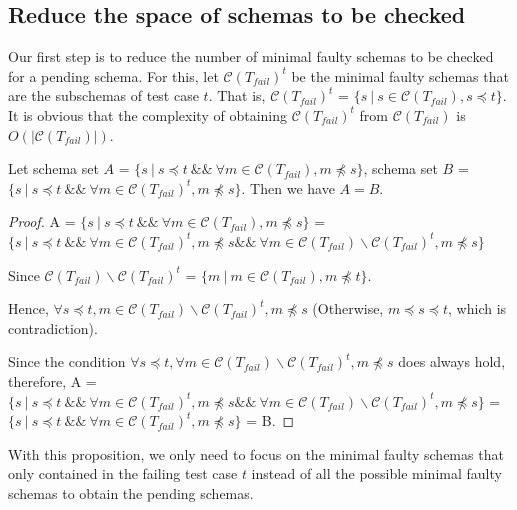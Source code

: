 \subsection{Reduce the space of schemas to be checked}
Our first step is to reduce the number of minimal faulty schemas to be checked for a pending schema.  For this, let $\mathcal{C}(T_{fail})^{t}$ be the minimal faulty schemas that are the subschemas of test case $t$. That is, $\mathcal{C}(T_{fail})^{t}$ = $\{ s\ | \ s \in \mathcal{C}(T_{fail}), s \preceq t \}$.  It is obvious that the complexity of obtaining $\mathcal{C}(T_{fail})^{t}$ from $\mathcal{C}(T_{fail})$ is $O(|\mathcal{C}(T_{fail})|)$.


\begin{proposition}\label{pro:mfssintequal}
Let schema set $A$ = $\{ s\ |\ s \preceq t\ \&\&\ \forall m \in \mathcal{C}(T_{fail}),  m \npreceq s \}$,  schema set $B$ = $\{ s\ |\ s \preceq t\ \&\&\ \forall m \in \mathcal{C}(T_{fail})^{t},  m \npreceq s \}$. Then we have $A = B$.
\end{proposition}

\begin{proof}

A = $\{ s\ |\  s \preceq t\ \&\&\ \forall m \in \mathcal{C}(T_{fail}),  m \npreceq s \}$
 =
$\{ s\ |\  s \preceq t\ \&\&\ \forall m \in \mathcal{C}(T_{fail})^{t},  m \npreceq s \&\&\   \forall m \in \mathcal{C}(T_{fail}) \backslash \mathcal{C}(T_{fail})^{t},  m \npreceq s  \}$

Since $\mathcal{C}(T_{fail}) \backslash \mathcal{C}(T_{fail})^{t}$ = $\{ m \ | \ m \in \mathcal{C}(T_{fail}), m \npreceq t \}$.

Hence, $\forall s \preceq t, m \in \mathcal{C}(T_{fail}) \backslash \mathcal{C}(T_{fail})^{t},  m \npreceq s$ (Otherwise, $m \preceq s \preceq t$, which is contradiction).

Since the condition $\forall s \preceq t, \forall m \in \mathcal{C}(T_{fail}) \backslash \mathcal{C}(T_{fail})^{t},  m \npreceq s $ does always hold, therefore, A =
$\{ s\ |\  s \preceq t\ \&\&\ \forall m \in \mathcal{C}(T_{fail})^{t},  m \npreceq s \&\&\   \forall m \in \mathcal{C}(T_{fail}) \backslash \mathcal{C}(T_{fail})^{t},  m \npreceq s  \}$  =
$\{ s\ |\  s \preceq t\ \&\&\ \forall m \in \mathcal{C}(T_{fail})^{t},  m \npreceq s \}$ = B.
\end{proof}

With this proposition, we only need to focus on the minimal faulty schemas that only contained in the failing test case $t$ instead of all the possible minimal faulty schemas to obtain the pending schemas. %

